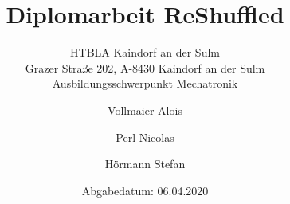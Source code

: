 \documentclass
[
a4paper,                                                            %
12pt,                                                                %
oneside,                                                       %
openright,                                                            %
titlepage,                                                            %
headinclude,                                                        %
numbers=noenddot,                                                    %
listof=numbered,                                                    %
bibliography=totocnumbered,                                            %
]
{scrbook}                                                            %
\title{Diplomarbeit ReShuffled}
\subtitle{
HTBLA Kaindorf an der Sulm\\
Grazer Straße 202, A-8430 Kaindorf an der Sulm\\
Ausbildungsschwerpunkt Mechatronik}
\author{Vollmaier Alois \and Perl Nicolas \and Hörmann Stefan}
\date{Abgabedatum: 06.04.2020}
\begin{document}
    \onehalfspace
    \maketitle
    \tableofcontents



    
    
    
    
\end{document}

